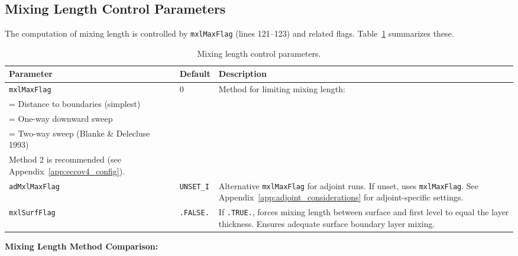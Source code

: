 \documentclass[12pt,letterpaper]{article}
\begin{document}
\subsection{Mixing Length Control Parameters}

The computation of mixing length is controlled by \texttt{mxlMaxFlag} (lines
121--123) and related flags. Table~\ref{tab:mixlen_params} summarizes these.

\begin{table}[h!]
\centering
\caption{Mixing length control parameters.}
\label{tab:mixlen_params}
\begin{tabular}{@{}llp{8cm}@{}}
\toprule
\textbf{Parameter} & \textbf{Default} & \textbf{Description} \\
\midrule
\texttt{mxlMaxFlag} & 0 & Method for limiting mixing length:\\
                          \quad 0 = Distance to boundaries (simplest)\\
                          \quad 1 = One-way downward sweep\\
                          \quad 2 = Two-way sweep (Blanke \& Delecluse 1993)\\
                          Method 2 is recommended (see
                          Appendix~\ref{app:eccov4_config}). \\[6pt]

\texttt{adMxlMaxFlag} & \texttt{UNSET\_I} & Alternative \texttt{mxlMaxFlag}
                                             for adjoint runs. If unset, uses
                                             \texttt{mxlMaxFlag}. See
                                             Appendix~\ref{app:adjoint_considerations}
                                             for adjoint-specific settings. \\[6pt]

\texttt{mxlSurfFlag} & \texttt{.FALSE.} & If \texttt{.TRUE.}, forces mixing
                                           length between surface and first
                                           level to equal the layer thickness.
                                           Ensures adequate surface boundary
                                           layer mixing. \\

\bottomrule
\end{tabular}
\end{table}

\textbf{Mixing Length Method Comparison:}
\end{document}
